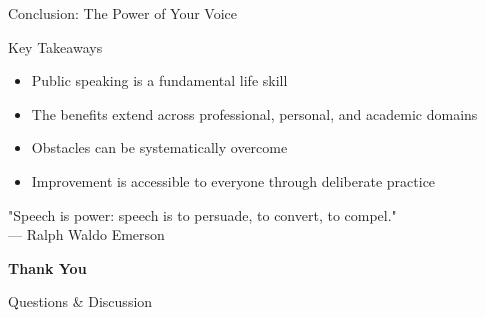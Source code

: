 \documentclass{beamer}
\begin{document}
\begin{frame}{Conclusion: The Power of Your Voice}
    \begin{block}{Key Takeaways}
        \begin{itemize}
            \item Public speaking is a fundamental life skill
            \item The benefits extend across professional, personal, and academic domains
            \item Obstacles can be systematically overcome
            \item Improvement is accessible to everyone through deliberate practice
        \end{itemize}
    \end{block}
    
    \begin{center}
        \large "Speech is power: speech is to persuade, to convert, to compel."\\
        \normalsize — Ralph Waldo Emerson
    \end{center}
\end{frame}

\begin{frame}[plain]
    \vspace{2cm}
    \begin{center}
        \fontsize{40}{48}\selectfont\textbf{Thank You}
        
        \vspace{1.5cm}
        \normalsize Questions \& Discussion
    \end{center}
\end{frame}
\end{document}
